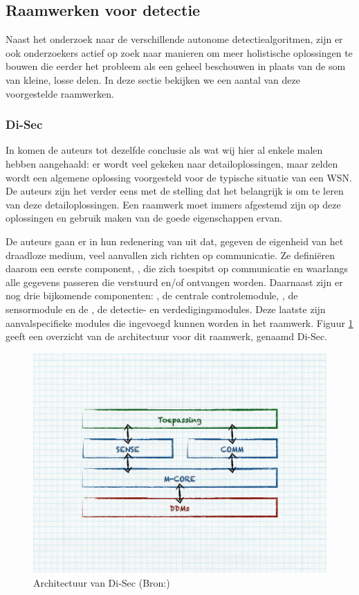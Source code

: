 
\subsection{Raamwerken voor detectie}
\label{subsection:frameworks}

Naast het onderzoek naar de verschillende autonome detectiealgoritmen, zijn er
ook onderzoekers actief op zoek naar manieren om meer holistische oplossingen
te bouwen die eerder het probleem als een geheel beschouwen in plaats van de
som van kleine, losse delen. In deze sectie bekijken we een aantal van deze
voorgestelde raamwerken.

\subsubsection*{Di-Sec}
\label{subsubsection:di-sec}

In \citep{valero2012di} komen de auteurs tot dezelfde conclusie als wat wij
hier al enkele malen hebben aangehaald: er wordt veel gekeken naar
detailoplossingen, maar zelden wordt een algemene oplossing voorgesteld voor de
typische situatie van een WSN. De auteurs zijn het verder eens met de stelling
dat het belangrijk is om te leren van deze detailoplossingen. Een raamwerk moet
immers afgestemd zijn op deze oplossingen en gebruik maken van de goede
eigenschappen ervan.

De auteurs gaan er in hun redenering van uit dat, gegeven de eigenheid van het
draadloze medium, veel aanvallen zich richten op communicatie. Ze defini\"eren
daarom een eerste component, , die zich toespitst op communicatie en
waarlangs alle gegevens passeren die verstuurd en/of ontvangen worden.
Daarnaast zijn er nog drie bijkomende componenten: , de centrale
controlemodule, , de sensormodule en de , de detectie- en
verdedigingsmodules. Deze laatste zijn aanvalspecifieke modules die ingevoegd
kunnen worden in het raamwerk. Figuur \ref{fig:di-sec-architecture} geeft een
overzicht van de architectuur voor dit raamwerk, genaamd Di-Sec.

\begin{figure}[ht]
  \centering
  \includegraphics[width=0.8\linewidth]{resources/di-sec-architecture.pdf}
  \caption[Architectuur van Di-Sec]{Architectuur van Di-Sec (Bron:\citep{valero2012di})}
  \label{fig:di-sec-architecture}
\end{figure}

